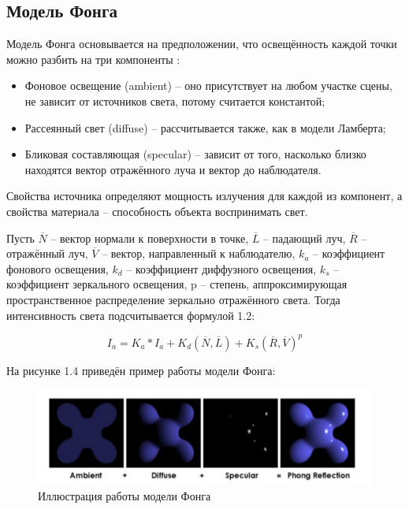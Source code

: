 \subsection{Модель Фонга}
Модель Фонга основывается на предположении, что освещённость каждой точки можно разбить на три компоненты \cite{light}:
\begin{itemize}
	\item Фоновое освещение (ambient) – оно присутствует на любом участке сцены, не зависит от источников света, потому считается константой;
	\item Рассеянный свет (diffuse) – рассчитывается также, как в модели Ламберта;
	\item Бликовая составляющая (specular) – зависит от того, насколько близко находятся вектор отражённого луча и вектор до наблюдателя.
\end{itemize}

Свойства источника определяют мощность излучения для каждой из компонент, а свойства материала – способность объекта воспринимать свет.


Пусть $ \overline{N} $ – вектор нормали к поверхности в точке, $ \overline{L} $ – падающий луч, $ \overline{R} $ – отражённый луч,
$ \overline{V} $ – вектор, направленный к наблюдателю, $ k_a $ – коэффициент фонового освещения, $ k_d $ – коэффициент диффузного освещения, 
$ k_s $ – коэффициент зеркального освещения, p – степень, аппроксимирующая пространственное распределение зеркально отражённого света.
Тогда интенсивность света подсчитывается формулой 1.2:

\begin{equation}
	I_a = K_a * I_a + K_d(\overline{N}, \overline{L}) +  K_s(\overline{R}, \overline{V})^p
\end{equation}

На рисунке 1.4 приведён пример работы модели Фонга:
\FloatBarrier
\begin{figure}[h]
	\begin{center}
		\includegraphics[width=\linewidth]{inc/fong.png}
	\end{center}
	\caption{Иллюстрация работы модели Фонга}
\end{figure}
\FloatBarrier

